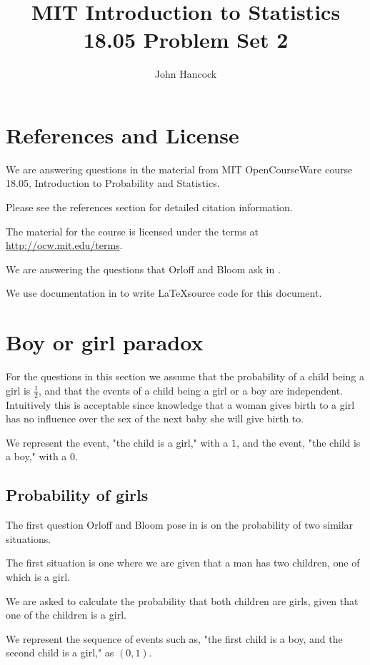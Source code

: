 \documentclass[a4paper,11pt]{article}
\author{John Hancock}
\title{MIT Introduction to Statistics 18.05 Problem Set 2 }
\begin{document}
\maketitle
\tableofcontents
\section{References and License}
We are answering questions in the material from MIT OpenCourseWare
course 18.05, Introduction to Probability and Statistics.

Please see the references section for detailed citation information.

The material for the course is licensed under the terms at 
\url{http://ocw.mit.edu/terms}.

We are answering the questions that Orloff and Bloom ask in
\cite{probSet2}.

We use documentation in  to write \LaTeX source code
for this document.

\section{Boy or girl paradox}

For the questions in this section we assume that the probability of a child being a girl is $\frac{1}{2}$,
and that the events of a child being a girl or a boy are independent.
Intuitively this is acceptable since knowledge that a woman gives birth
to a girl has no influence over the sex of the next baby she will give
birth to.

We represent the event, "the child is a girl," with a $1$, and
the event, "the child is a boy," with a $0$.


\subsection{Probability of girls}
The first question Orloff and Bloom pose in \cite{probSet2} is
on the probability of two similar situations.

The first situation is one where we are given that a man has
two children, one of which is a girl.

We are asked to calculate the probability that both children
are girls, given that one of the children is a girl.


We represent the sequence of events such as, "the first child is  a boy, and the 
second child is a girl," as $\left( 0, 1 \right)$. 
\end{document}
